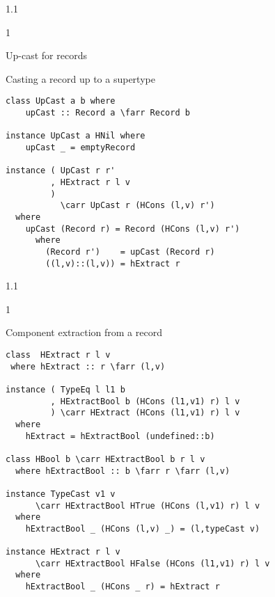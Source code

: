 \documentclass{slides}
\newenvironment{myslide}{\begin{slide}\color{Blue}\begin{boxedminipage}{1.1\hsize}\begin{boxedminipage}{1\hsize}\color{Black}
\vspace{-170\in}
}{%
\smallskip
\end{boxedminipage}
\end{boxedminipage}
\end{slide}}
\newenvironment{myslide}{\begin{slide}
}{%
\end{slide}}
\newenvironment{myslide}{\begin{slide}\color{White}\begin{boxedminipage}{1.1\hsize}\color{Black}
\vspace{-170\in}
}{%
\smallskip
\end{boxedminipage}
\end{slide}}
\newcommand{\header}[1]{{\large \color{Red} #1}}
\newcommand{\blau}[1]{{\vspace{-50\in}\normalsize \color{Blue} #1}}
\newcommand{\farr}{\ensuremath{\to}}
\newcommand{\carr}{\ensuremath{\Rightarrow}}
\begin{document}



\begin{myslide}

\header{Up-cast for records}

\vspace{-77\in}

\blau{Casting a record up to a supertype}

\smallskip

\begin{Verbatim}[fontfamily=courier,fontsize=\small,commandchars=\\\{\}]
class UpCast a b where
    upCast :: Record a \farr Record b

instance UpCast a HNil where
    upCast _ = emptyRecord

instance ( UpCast r r'
         , HExtract r l v
         )
           \carr UpCast r (HCons (l,v) r')
  where
    upCast (Record r) = Record (HCons (l,v) r')
      where
        (Record r')    = upCast (Record r)
        ((l,v)::(l,v)) = hExtract r
\end{Verbatim}

\end{myslide}






\begin{myslide}

\bigskip
\bigskip

\blau{Component extraction from a record}

\bigskip

\begin{Verbatim}[fontfamily=courier,fontsize=\tiny,commandchars=\\\{\}]
class  HExtract r l v
 where hExtract :: r \farr (l,v)

instance ( TypeEq l l1 b
         , HExtractBool b (HCons (l1,v1) r) l v
         ) \carr HExtract (HCons (l1,v1) r) l v
  where
    hExtract = hExtractBool (undefined::b)

class HBool b \carr HExtractBool b r l v
  where hExtractBool :: b \farr r \farr (l,v)

instance TypeCast v1 v
      \carr HExtractBool HTrue (HCons (l,v1) r) l v
  where
    hExtractBool _ (HCons (l,v) _) = (l,typeCast v)

instance HExtract r l v
      \carr HExtractBool HFalse (HCons (l1,v1) r) l v
  where
    hExtractBool _ (HCons _ r) = hExtract r
\end{Verbatim}

\end{myslide}
\end{document}

